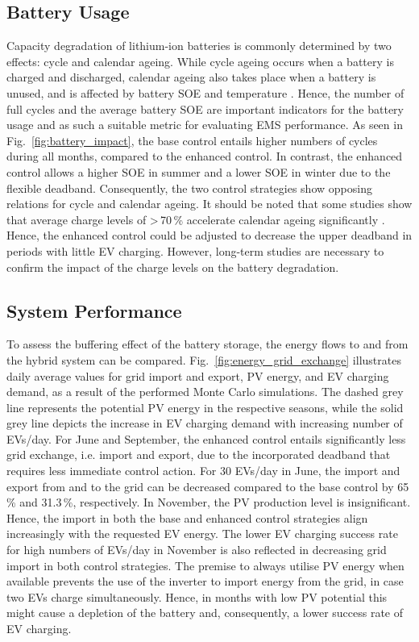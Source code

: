 \documentclass[final,5p,times,twocolumn]{elsarticle}
\begin{document}
\subsection{Battery Usage}

Capacity degradation of lithium-ion batteries is commonly determined by two effects: cycle and calendar ageing. While cycle ageing occurs when a battery is charged and discharged, calendar ageing also takes place when a battery is unused, and is affected by battery SOE and temperature \cite{Barre.2013}. Hence, the number of full cycles and the average battery SOE are important indicators for the battery usage and as such a suitable metric for evaluating EMS performance. As seen in Fig.~\ref{fig:battery_impact}, the base control entails higher numbers of cycles during all months, compared to the enhanced control. In contrast, the enhanced control allows a higher SOE in summer and a lower SOE in winter due to the flexible deadband. Consequently, the two control strategies show opposing relations for cycle and calendar ageing. It should be noted that some studies show that average charge levels of \textgreater\,70\,\% accelerate calendar ageing significantly \cite{Keil.2016}. Hence, the enhanced control could be adjusted to decrease the upper deadband in periods with little EV charging. However, long-term studies are necessary to confirm the impact of the charge levels on the battery degradation.

\subsection{System Performance}

To assess the buffering effect of the battery storage, the energy flows to and from the hybrid system can be compared. Fig.~\ref{fig:energy_grid_exchange} illustrates daily average values for grid import and export, PV energy, and EV charging demand, as a result of the performed Monte Carlo simulations. The dashed grey line represents the potential PV energy in the respective seasons, while the solid grey line depicts the increase in EV charging demand with increasing number of EVs/day. For June and September, the enhanced control entails significantly less grid exchange, i.e. import and export, due to the incorporated deadband that requires less immediate control action. For 30 EVs/day in June, the import and export from and to the grid can be decreased compared to the base control by 65\,\% and 31.3\,\%, respectively. In November, the PV production level is insignificant. Hence, the import in both the base and enhanced control strategies align increasingly with the requested EV energy. The lower EV charging success rate for high numbers of EVs/day in November is also reflected in decreasing grid import in both control strategies. The premise to always utilise PV energy when available prevents the use of the inverter to import energy from the grid, in case two EVs charge simultaneously. Hence, in months with low PV potential this might cause a depletion of the battery and, consequently, a lower success rate of EV charging.
\end{document}
